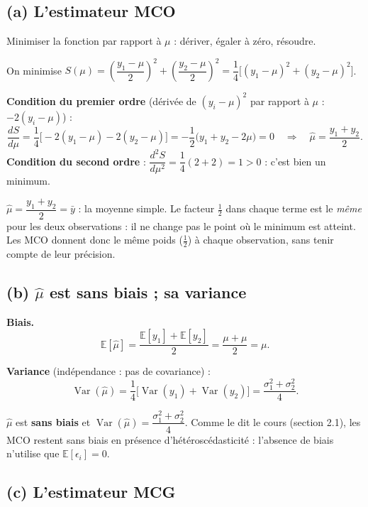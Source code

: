 \documentclass[11pt,a4paper]{article}
\newcommand{\E}{\mathbb{E}}\newcommand{\Var}{\operatorname{Var}}\newcommand{\Cov}{\operatorname{Cov}}
\begin{document}
\subsection*{(a) L'estimateur MCO}

\begin{idee}
Minimiser la fonction par rapport à $\mu$ : dériver, égaler à zéro, résoudre.
\end{idee}

On minimise $S(\mu)=\left(\dfrac{y_1-\mu}{2}\right)^2+\left(\dfrac{y_2-\mu}{2}\right)^2=\dfrac14\Big[(y_1-\mu)^2+(y_2-\mu)^2\Big]$.

\textbf{Condition du premier ordre} (dérivée de $(y_i-\mu)^2$ par rapport à $\mu$ : $-2(y_i-\mu)$) :
\[
\frac{dS}{d\mu}=\frac14\big[-2(y_1-\mu)-2(y_2-\mu)\big]=-\frac12\big(y_1+y_2-2\mu\big)=0
\quad\Longrightarrow\quad
\hat\mu=\frac{y_1+y_2}{2}.
\]
\textbf{Condition du second ordre} : $\dfrac{d^2S}{d\mu^2}=\dfrac14(2+2)=1>0$ : c'est bien un minimum.

\begin{reponse}
$\hat\mu=\dfrac{y_1+y_2}{2}=\bar y$ : la moyenne simple. Le facteur $\frac12$ dans chaque terme est le \emph{même} pour les deux observations : il ne change pas le point où le minimum est atteint. Les MCO donnent donc le même poids ($\frac12$) à chaque observation, sans tenir compte de leur précision.
\end{reponse}

\subsection*{(b) $\hat\mu$ est sans biais ; sa variance}

\textbf{Biais.}
\[
\E[\hat\mu]=\frac{\E[y_1]+\E[y_2]}{2}=\frac{\mu+\mu}{2}=\mu .
\]

\textbf{Variance} (indépendance : pas de covariance) :
\[
\Var(\hat\mu)=\frac14\big[\Var(y_1)+\Var(y_2)\big]=\frac{\sigma_1^2+\sigma_2^2}{4}.
\]

\begin{reponse}
$\hat\mu$ est \textbf{sans biais} et $\Var(\hat\mu)=\dfrac{\sigma_1^2+\sigma_2^2}{4}$. Comme le dit le cours (section 2.1), les MCO restent sans biais en présence d'hétéroscédasticité : l'absence de biais n'utilise que $\E[\epsilon_i]=0$.
\end{reponse}

\subsection*{(c) L'estimateur MCG}
\end{document}

